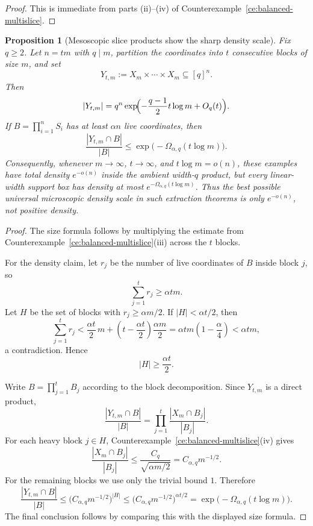 \documentclass[11pt]{article}
\newtheorem{proposition}[theorem]{Proposition}
\theoremstyle{definition}
\newcommand{\1}{\mathbf{1}}
\begin{document}
\begin{proof}
This is immediate from parts (ii)--(iv) of Counterexample~\ref{ce:balanced-multislice}.
\end{proof}

\begin{proposition}[Mesoscopic slice products show the sharp density scale]\label{prop:mesoscopic-slice-density}
Fix $q\ge 2$. Let $n=tm$ with $q\mid m$, partition the coordinates into $t$ consecutive blocks of size $m$, and set
\[
Y_{t,m}:=X_m\times \cdots \times X_m\subseteq [q]^n.
\]
Then
\[
|Y_{t,m}|=
q^n\exp\!\Bigl(-\frac{q-1}{2}t\log m+O_q(t)\Bigr).
\]
If $B=\prod_{i=1}^n S_i$ has at least $\alpha n$ live coordinates, then
\[
\frac{|Y_{t,m}\cap B|}{|B|}
\le
\exp\bigl(-\Omega_{\alpha,q}(t\log m)\bigr).
\]
Consequently, whenever $m\to\infty$, $t\to\infty$, and $t\log m=o(n)$, these examples have total density $e^{-o(n)}$ inside the ambient width-$q$ product, but every linear-width support box has density at most $e^{-\Omega_{\alpha,q}(t\log m)}$. Thus the best possible universal microscopic density scale in such extraction theorems is only $e^{-o(n)}$, not positive density.
\end{proposition}

\begin{proof}
The size formula follows by multiplying the estimate from Counterexample~\ref{ce:balanced-multislice}(iii) across the $t$ blocks.

For the density claim, let $r_j$ be the number of live coordinates of $B$ inside block $j$, so
\[
\sum_{j=1}^t r_j\ge \alpha tm.
\]
Let $H$ be the set of blocks with $r_j\ge \alpha m/2$. If $|H|<\alpha t/2$, then
\[
\sum_{j=1}^t r_j
<
\frac{\alpha t}{2}\,m+\left(t-\frac{\alpha t}{2}\right)\frac{\alpha m}{2}
=
\alpha tm\left(1-\frac{\alpha}{4}\right)
<
\alpha tm,
\]
a contradiction. Hence
\[
|H|\ge \frac{\alpha t}{2}.
\]

Write $B=\prod_{j=1}^t B_j$ according to the block decomposition. Since $Y_{t,m}$ is a direct product,
\[
\frac{|Y_{t,m}\cap B|}{|B|}
=
\prod_{j=1}^t \frac{|X_m\cap B_j|}{|B_j|}.
\]
For each heavy block $j\in H$, Counterexample~\ref{ce:balanced-multislice}(iv) gives
\[
\frac{|X_m\cap B_j|}{|B_j|}
\le
\frac{C_q}{\sqrt{\alpha m/2}}
=
C_{\alpha,q}m^{-1/2}.
\]
For the remaining blocks we use only the trivial bound $1$. Therefore
\[
\frac{|Y_{t,m}\cap B|}{|B|}
\le
\bigl(C_{\alpha,q}m^{-1/2}\bigr)^{|H|}
\le
\bigl(C_{\alpha,q}m^{-1/2}\bigr)^{\alpha t/2}
=
\exp\bigl(-\Omega_{\alpha,q}(t\log m)\bigr).
\]
The final conclusion follows by comparing this with the displayed size formula.
\end{proof}
\end{document}
